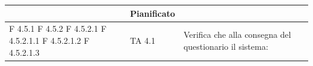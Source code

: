 \documentclass[a4paper,11pt]{article}
\begin{document}
\begin{longtable}{p{}p{}p{}p{}}
\begin{enumerate}
\end{enumerate} & Pianificato\\

\midrule
F 4.5.1 \newline F 4.5.2 \newline F 4.5.2.1 \newline F 4.5.2.1.1 \newline F 4.5.2.1.2 \newline F 4.5.2.1.3& TA 4.1 &Verifica che alla consegna del questionario il sistema: 

\end{longtable}
\end{document}
